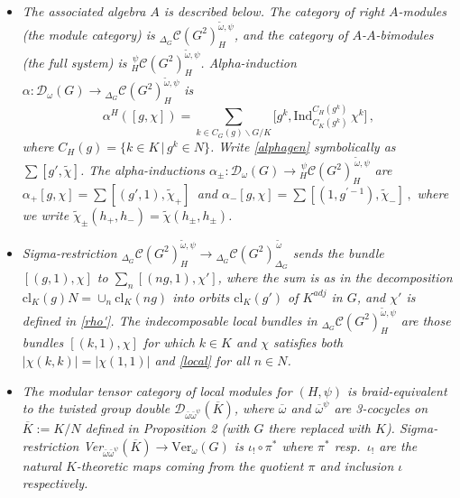 \documentclass[12pt]{article}
\numberwithin{equation}{section}
\def\cC            {{\mathcal{C}}}
\def\cD            {{\mathcal{D}}}
\begin{document}
\begin{itemize}\item[{(i)}] \textit{The associated algebra $A$ is described below. The category of right $A$-modules (the module category) is ${}_{\Delta_G}\cC(G^2)^{\tilde{\omega},\psi}_{H}$, and the category of $A$-$A$-bimodules (the full system) is ${}_{H}^{\,\psi}\cC(G^2)^{\tilde{\omega},\psi}_{H}$. Alpha-induction $\alpha:\cD_\omega (G)\rightarrow{}_{\Delta_G}\cC(G^2)^{\tilde{\omega},\psi}_{H}$ is
 \begin{equation}\alpha^H([g,\chi])=\sum_{k\in C_G(g)\backslash G/K}\bigl[g^k, \mathrm{Ind}_{ C_K(g^k)}^{C_H(g^k)}\,\chi^{k}\bigr]
 \,,\label{alphagen}\end{equation}
where $C_H(g)=\{k\in K\,|\,g^k\in N\}$. Write \eqref{alphagen} symbolically as $\sum [g',\widetilde{\chi}]$.
The alpha-inductions $\alpha_\pm:\cD_\omega (G)\rightarrow{}_{H}^{\,\psi}\cC(G^2)^{\,\tilde{\omega},\psi}_{H}$ are
 $\alpha_+[g,{\chi}]= \sum [(g',1),\widetilde{\chi}_+]\,$ and
 $\alpha_-[g,{\chi}]=\sum [(1,g^{\prime-1}),\widetilde{\chi}_-]\,,$
 where we 
 write $\widetilde{\chi}_\pm(h_+,h_-)=\widetilde{\chi}(h_\pm,h_\pm)$.}
 
\item[{(ii)}] \textit{Sigma-restriction ${}_{\Delta_G}\cC(G^2)_H^{\tilde{\omega},\psi}\rightarrow {}_{\Delta_G}\cC(G^2)^{\,\tilde{\omega}}_{\Delta_G}$ sends the bundle $[(g,1),\chi]$ to
$\sum_n[(ng,1),\chi']$, where the sum is as in the decomposition $\mathrm{cl}_K(g)N=\cup_n\mathrm{cl}_K({ng})$ into  orbits $\mathrm{cl}_K(g')$  of $K^{adj}$ in $G$, and $\chi'$ is defined in \eqref{rho'}. The  indecomposable local bundles in ${}_{\Delta_G}\cC(G^2)_H^{\tilde{\omega},\psi}$ are those bundles $[(k,1),{\chi}]$ for which $k\in K$ and $\chi$ satisfies both $|\chi(k,k)|=|\chi(1,1)|$ and
\eqref{local} for all $n\in N$.
}




\item[{(iii)}] \textit{
The modular tensor category of local modules for $(H,\psi)$  is braid-equivalent to the twisted group double $\cD_{\bar{\omega}\bar{\omega}^\psi}(\overline{K})$, where $\overline{\omega}$ and $\overline{\omega}^\psi$ are 3-cocycles 
on $\overline{K}:=K/N$ defined in Proposition 2 (with $G$ there replaced with $K$). Sigma-restriction
Ver$_{\bar{\omega}\bar{\omega}^\psi}(\overline{K})\rightarrow\mathrm{Ver}_\omega(G)$
is $\iota_!\circ\pi^*$ where $\pi^*$ resp.\ $\iota_!$ are the natural $K$-theoretic maps coming from the quotient $\pi$ and inclusion $\iota$ respectively.}
\end{itemize}
\end{document}
